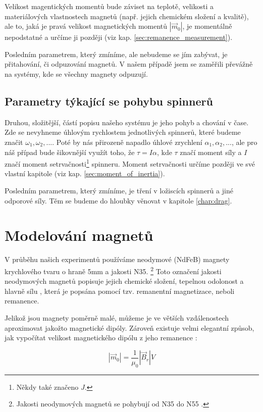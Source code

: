 \documentclass[12pt, a4paper,
 twoside,        %
 openright
]{report}
\begin{document}
Velikost magentických momentů bude záviset na teplotě, velikosti a materiálových vlastnostech magnetů (např. jejich chemickém složení a kvalitě), ale to, jaká je pravá velikost magnetických momentů $|\vec{m}_0|$, je momentálně nepodstatné a určíme ji později (viz kap. \ref{sec:remanence_measurement}).

Posledním parametrem, který zmíníme, ale nebudeme se jím zabývat, je přitahování, či odpuzování magnetů.
V našem případě jsem se zaměřili převážně na systémy, kde se všechny magnety odpuzují.

\subsection{Parametry týkající se pohybu spinnerů}

Druhou, složitější, částí popisu našeho systému je jeho pohyb a chování v čase.
Zde se nevyhneme úhlovým rychlostem jednotlivých spinnerů, které budeme značit $\omega_1, \omega_2,...$.
Poté by nás přirozeně napadlo úhlové zrychlení $\alpha_1, \alpha_2, ...$, ale pro náš případ bude šikovnější využít toho, že $\tau = I\alpha$, kde $\tau$ značí moment síly a $I$ značí moment setrvačnosti\footnote{Někdy také značeno $J$.} spinneru.
Moment setrvačnosti určíme později ve své vlastní kapitole (viz kap. \ref{sec:moment_of_inertia}).

Posledním parametrem, který zmíníme, je tření v ložiscích spinnerů a jiné odporové síly.
Těm se budeme do hloubky věnovat v kapitole \ref{chap:drag}.

\clearpage

\section{Modelování magnetů}
V průběhu našich experimentů používáme neodymové (NdFeB) magnety krychlového tvaru o hraně 5mm a jakosti N35. \footnote{Jakosti neodymových magnetů se pohybují od N35 do N55 \cite{magnet_grades}.}
Toto označení jakosti neodymových magnetů popisuje jejich chemické složení, tepelnou odolonost a hlavně sílu \cite{magnet_grades}, která je popsána pomocí tzv. remanentní magnetizace, neboli remanence.

Jelikož jsou magnety poměrně malé, můžeme je ve větších vzdálenostech aproximovat jakožto magnetické dipóly.
Zároveň existuje velmi elegantní způsob, jak vypočítat velikost magnetického dipólu z jeho remanence \cite{magnetic_torque}:

\begin{equation}
    \label{eq:mag_mom_remanence}
    |\vec{m}_0| = \frac{1}{\mu_0}|\vec{B}_r|V
\end{equation}
\end{document}
